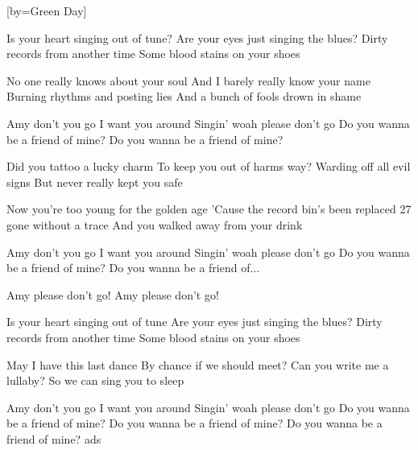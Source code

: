  

[by=Green Day]




\beginverse
Is your heart singing out of tune?
Are your eyes just singing the blues?
Dirty records from another time
Some blood stains on your shoes

No one really knows about your soul
And I barely really know your name
Burning rhythms and posting lies
And a bunch of fools drown in shame
\endverse

\beginchorus
Amy don't you go
I want you around
Singin' woah please don't go
Do you wanna be a friend of mine?
Do you wanna be a friend of mine?
\endchorus

\beginverse
Did you tattoo a lucky charm
To keep you out of harms way?
Warding off all evil signs
But never really kept you safe

Now you're too young for the golden age
'Cause the record bin's been replaced
27 gone without a trace
And you walked away from your drink
\endverse

\beginchorus
Amy don't you go
I want you around
Singin' woah please don't go
Do you wanna be a friend of mine?
Do you wanna be a friend of...
\endchorus

\beginverse
Amy please don't go!
Amy please don't go!

Is your heart singing out of tune
Are your eyes just singing the blues?
Dirty records from another time
Some blood stains on your shoes

May I have this last dance
By chance if we should meet?
Can you write me a lullaby?
So we can sing you to sleep
\endverse

\beginchorus
Amy don't you go
I want you around
Singin' woah please don't go
Do you wanna be a friend of mine?
Do you wanna be a friend of mine?
Do you wanna be a friend of mine? ads
\endchorus

\endsong
